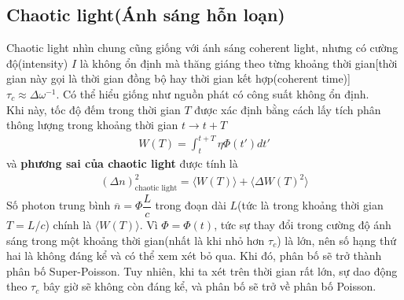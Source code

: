 \documentclass{report}
\newcommand{\mean}[1]{\langle{#1}\rangle}
\newcommand{\f}[2]{\dfrac{#1}{#2}}
\begin{document}
\subsection{Chaotic light(Ánh sáng hỗn loạn)}
Chaotic light nhìn chung cũng giống với ánh sáng coherent light, nhưng có cường độ(intensity) $I$ là không ổn định mà thăng giáng theo từng khoảng thời gian[thời gian này gọi là thời gian đồng bộ hay thời gian kết hợp(coherent time)] $\tau_{c} \approx \Delta \omega^{-1}$. Có thể hiểu giống như nguồn phát có công suất không ổn định.\\
Khi này, tốc độ đếm trong thời gian $T$ được xác định bằng cách lấy tích phân thông lượng trong khoảng thời gian $t \rightarrow t + T$
\begin{gather}
	W(T) = \int_{t}^{t + T} \eta \Phi(t') dt'
\end{gather}
và \textbf{phương sai của chaotic light} được tính là
\begin{gather}
	(\Delta n)_{\text{chaotic light}}^{2} = \mean{W(T)} + \mean{\Delta W(T)^{2}}
\end{gather}
Số photon trung bình $\overline{n} = \Phi \f{L}{c}$ trong đoạn dài $L$(tức là trong khoảng thời gian$T = L/c$) chính là $\mean{W(T)}$. 
Vì $\Phi = \Phi(t)$, tức sự thay đổi trong cường độ ánh sáng trong một khoảng thời gian(nhất là khi nhỏ hơn $\tau_{c}$) là lớn, nên số hạng thứ hai là không đáng kể và có thể xem xét bỏ qua. Khi đó, phân bố sẽ trở thành phân bố Super-Poisson. Tuy nhiên, khi ta xét trên thời gian rất lớn, sự dao động theo $\tau_{c}$ bây giờ sẽ không còn đáng kể, và phân bố sẽ trở về phân bố Poisson.
\end{document}
